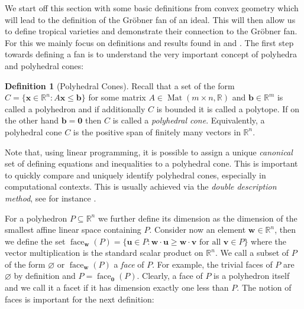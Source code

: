 \documentclass[
  paper=a4,
  titlepage,
  bibliography=totoc,
  pagesize=pdftex
]{scrartcl}
\numberwithin{figure}{section}
\numberwithin{equation}{section}
\numberwithin{table}{section}
\newcommand*\setR{\mathds{R}}
\let\vec\mathbf
\DeclareMathOperator{\Mat}{Mat}
\DeclareMathOperator{\face}{face}
\theoremstyle{definition}
\newtheorem{definition}{Definition}
\numberwithin{definition}{section}
\begin{document}
We start off this section with some basic definitions from convex geometry which will lead
to the definition of the Gröbner fan of an ideal. This will then allow us to define
tropical varieties and demonstrate their connection to the Gröbner fan. For this we mainly
focus on definitions and results found in \cite{compGrobFan} and \cite{SturmGBCP}. The
first step towards defining a fan is to understand the very important concept of polyhedra
and polyhedral cones:

\begin{definition}[Polyhedral Cones]
  \label{def:polyhedralCone}
  Recall that a set of the form $C = \{ \vec x \in \setR^n : A\vec x \leq \vec b \}$ for
  some matrix $A \in \Mat(m\times n, \setR)$ and $\vec b \in \setR^m$ is called a
  polyhedron and if additionally $C$ is bounded it is called a polytope. If on the other
  hand $\vec b = \vec 0$ then $C$ is called a \emph{polyhedral cone}. Equivalently, a
  polyhedral cone $C$ is the positive span of finitely many vectors in $\setR^n$.
\end{definition}

Note that, using linear programming, it is possible to assign a unique \emph{canonical}
set of defining equations and inequalities to a polyhedral cone. This is important to
quickly compare and uniquely identify polyhedral cones, especially in computational
contexts. This is usually achieved via the \emph{double description method}, see for
instance \cite{fuDD}.

For a polyhedron $P \subseteq \setR^n$ we further define its dimension as the dimension of
the smallest affine linear space containing $P$. Consider now an element $\vec w \in
\setR^n$, then we define the set $\face_{\vec w}(P) = \{ \vec u \in P : \vec w\cdot \vec u
\geq \vec w \cdot \vec v \text{ for all } \vec v\in P\}$ where the vector multiplication
is the standard scalar product on $\setR^n$. We call a subset of $P$ of the form
$\varnothing$ or $\face_{\vec w}(P)$ a \emph{face} of $P$. For example, the trivial faces
of $P$ are $\varnothing$ by definition and $P = \face_{\vec 0}(P)$. Clearly, a face of $P$
is a polyhedron itself and we call it a facet if it has dimension exactly one less than
$P$. The notion of faces is important for the next definition:
\end{document}
